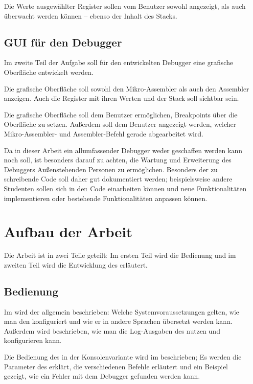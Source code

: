Die Werte ausgewählter Register sollen vom Benutzer sowohl angezeigt, als auch überwacht werden können -- ebenso der Inhalt des Stacks.

\subsection*{GUI für den Debugger}
Im zweite Teil der Aufgabe soll für den entwickelten Debugger eine grafische  Oberfläche entwickelt werden.

Die grafische Oberfläche soll sowohl den Mikro-Assembler als auch den Assembler anzeigen. Auch die Register mit ihren Werten und der Stack soll sichtbar sein.

Die grafische Oberfläche soll dem Benutzer ermöglichen, Breakpoints über die Oberfläche zu setzen. Außerdem soll dem Benutzer angezeigt werden, welcher Mikro-Assembler- und Assembler-Befehl gerade abgearbeitet wird.

Da in dieser Arbeit ein allumfassender Debugger weder geschaffen werden kann noch soll, ist besonders darauf zu achten, die Wartung und Erweiterung des Debuggers Außenstehenden Personen zu ermöglichen. Besonders der zu schreibende Code soll daher gut dokumentiert werden; beispielsweise andere Studenten sollen sich in den Code einarbeiten können und neue Funktionalitäten implementieren oder bestehende Funktionalitäten anpassen können.

\section*{Aufbau der Arbeit}
Die Arbeit ist in zwei Teile geteilt: Im ersten Teil wird die Bedienung und im zweiten Teil wird die Entwicklung des \md{} erläutert.

\subsection*{Bedienung}
Im  wird der \md{} allgemein beschrieben: Welche Systemvoraussetzungen gelten, wie man den \md{} konfiguriert und wie er in andere Sprachen übersetzt werden kann. Außerdem wird beschrieben, wie man die Log-Ausgaben des \md{} nutzen und konfigurieren kann.

Die Bedienung des \md{} in der Konsolenvariante wird im  beschrieben; Es werden die Parameter des \md{} erklärt, die verschiedenen Befehle erläutert und ein Beispiel gezeigt, wie ein Fehler mit dem Debugger gefunden werden kann.

